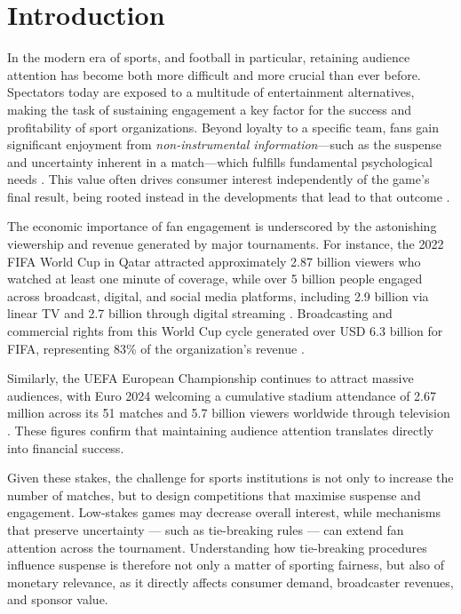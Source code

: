 \documentclass[11pt]{article}
\begin{document}
\newpage

\section{Introduction}

In the modern era of sports, and football in particular, retaining audience attention has become both more difficult and more crucial than ever before. Spectators today are exposed to a multitude of entertainment alternatives, making the task of sustaining engagement a key factor for the success and profitability of sport organizations. Beyond loyalty to a specific team, fans gain significant enjoyment from \emph{non-instrumental information}—such as the suspense and uncertainty inherent in a match—which fulfills fundamental psychological needs \citep{ely2015suspense, zillmann2013psychology}. This value often drives consumer interest independently of the game's final result, being rooted instead in the developments that lead to that outcome \citep{vorderer2004enjoyment}.

The economic importance of fan engagement is underscored by the astonishing viewership and revenue generated by major tournaments. For instance, the 2022 FIFA World Cup in Qatar attracted approximately 2.87 billion viewers who watched at least one minute of coverage, while over 5 billion people engaged across broadcast, digital, and social media platforms, including 2.9 billion via linear TV and 2.7 billion through digital streaming \citep{fifa2022engagement, fifa2022audience}. Broadcasting and commercial rights from this World Cup cycle generated over USD 6.3 billion for FIFA, representing 83\% of the organization's revenue \citep{fifa2022finance}.

Similarly, the UEFA European Championship continues to attract massive audiences, with Euro 2024 welcoming a cumulative stadium attendance of 2.67 million across its 51 matches and 5.7 billion viewers worldwide through television \citep{uefa2024numbers, uefa2024remember}. These figures confirm that maintaining audience attention translates directly into financial success.

Given these stakes, the challenge for sports institutions is not only to increase the number of matches, but to design competitions that maximise suspense and engagement. Low-stakes games may decrease overall interest, while mechanisms that preserve uncertainty — such as tie-breaking rules — can extend fan attention across the tournament. Understanding how tie-breaking procedures influence suspense is therefore not only a matter of sporting fairness, but also of monetary relevance, as it directly affects consumer demand, broadcaster revenues, and sponsor value.
\end{document}
